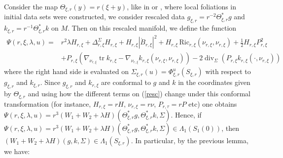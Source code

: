 \documentclass[12pt,a4paper]{amsart}
\theoremstyle{plain}
\theoremstyle{definition}
\newcommand{\diver}{\operatorname{div}}
\newcommand{\tr}{\operatorname{tr}}
\begin{document}
Consider the map $ \Theta_{\xi, r}(y)= r( \xi +y ) $,  like in \cite{diaz2023local} or \cite{main1local}, where local foliations in initial data sets were constructed,  we consider rescaled data    $g_{\xi, r} = r^{-2} \Theta^*_{\xi, r} g$ and $ k_{\xi, r} = r^{-1} \Theta^*_{\xi, r} k$ on $M$. Then on this rescaled manifold, we define the function
\begin{equation}\label{resc}
\begin{split}
    \Psi(r, \xi , \lambda, u)=&r^2 \lambda H_{r,\xi}  +\Delta_{r,\xi}^\Sigma H_{r,\xi} + H_{r,\xi}|\mathring{B}_{r,\xi}|^2+ H_{r,\xi} \,\mathrm{Ric}_{r,\xi}(\nu_{r,\xi}, \nu_{r,\xi})+\frac{1}{2}H_{r,\xi} P_{r,\xi}^2\\&+P_{r,\xi}( \nabla_{\nu_{r,\xi}} \tr k_{r,\xi} - \nabla_{\nu_{r,\xi}} k_{r,\xi}(\nu_{r,\xi},\nu_{r,\xi} ))  - 2\diver_\Sigma (P_{r,\xi}  k_{r,\xi}(\cdot, \nu_{r,\xi}))
    \end{split}
\end{equation}
where the right hand side is evaluated on $\Sigma_{\xi, r }(u)= \Phi^u_{\xi, r}(S_{\xi, r} )$ with respect to $g_{\xi,r}$  and $k_{\xi, r}$.  Since  $g_{\xi,r}$ and $k_{r,\xi}$  are conformal to $g$ and $k$ in the coordinates given by  $ \Theta_{\xi, r}$  and using how the different terms on  (\ref{resc}) change under this conformal transformation (for instance, $H_{r,\xi}= r H$, $\nu_{r,\xi}= r \nu $, $P_{r,\tau}= r P $ etc) one obtains  $ \Psi(r, \xi , \lambda, u)= r^3 (W_1+W_2 +\lambda H)(\Theta^*_{\xi, r} g, \Theta^*_{\xi, r} k, \Sigma)$. Hence,  if $\Psi(r, \xi , \lambda, u)= r^3 (W_1+W_2+\lambda H)(\Theta^*_{\xi, r} g, \Theta^*_{\xi, r} k, \Sigma) \in \Lambda_1(S_1(0)) $, then $(W_1+W_2+\lambda H)(g,  k, \Sigma) \in \Lambda_1(S_{\xi,r}) $. In particular,  by the previous lemma, we have:
\end{document}
